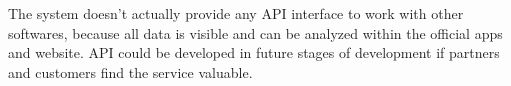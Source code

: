 The system doesn't actually provide any API interface to work with other softwares, because all data is visible and can be analyzed within the official apps and website. API could be developed in future stages of development if partners and customers find the service valuable.
